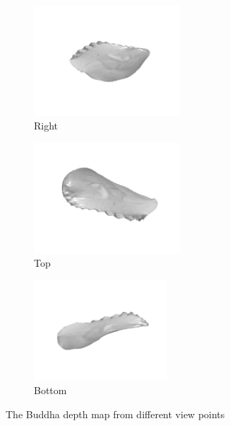 \documentclass[12pt,a4paper,oneside,final]{article}
\begin{document}
\begin{figure}[H]
	\centering
	\begin{subfigure}{.33\textwidth}
		\centering
		\includegraphics[width=5.5cm]{Buddha1}
		\caption{Right}
	\end{subfigure}%
	\begin{subfigure}{.33\textwidth}
		\centering
		\includegraphics[width=5.5cm]{Buddha2}
		\caption{Top}
	\end{subfigure}%
	\begin{subfigure}{.33\textwidth}
		\centering
		\includegraphics[width=5cm]{Buddha3}
		\caption{Bottom}
	\end{subfigure}
	\caption{The Buddha depth map from different view points}
	\label{fig:BuddahDepth}
\end{figure}
\end{document}
